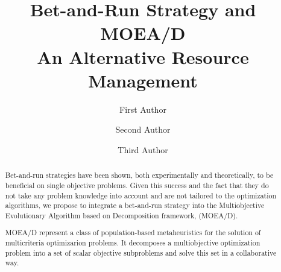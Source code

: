 \documentclass[runningheads]{llncs}
\begin{document}
%
\title{Bet-and-Run Strategy and MOEA/D \\ An Alternative Resource Management}
%
%
\author{First Author \and
Second Author \and
Third Author}
%
%
%
\maketitle              %
%
\begin{abstract}
Bet-and-run strategies have been shown, both experimentally and theoretically, to be beneficial on single objective problems. Given this success and the fact that they do not take any problem knowledge into account and are not tailored to the optimization algorithms, we propose to integrate a bet-and-run strategy into the Multiobjective Evolutionary Algorithm based on Decomposition framework, (MOEA/D). 

MOEA/D represent a class of population-based metaheuristics for the solution of multicriteria optimizarion problems. It decomposes a multiobjective optimization problem into a set of scalar objective subproblems and solve this set in a collaborative way. 

\end{abstract}
%
%
%

 






 
\end{document}

